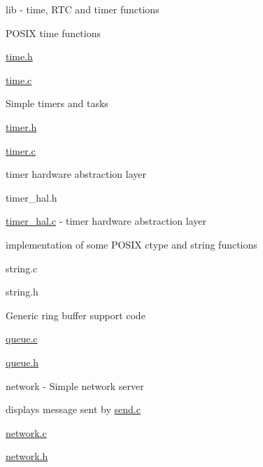 \begin{DoxyItemize}
\item lib -\/ time, R\+TC and timer functions
\begin{DoxyItemize}
\item P\+O\+S\+IX time functions
\begin{DoxyItemize}
\item \hyperlink{time_8h}{time.\+h}
\item \hyperlink{time_8c}{time.\+c}
\end{DoxyItemize}
\item Simple timers and tasks
\begin{DoxyItemize}
\item \hyperlink{timer_8h}{timer.\+h}
\item \hyperlink{timer_8c}{timer.\+c}
\end{DoxyItemize}
\item timer hardware abstraction layer
\begin{DoxyItemize}
\item timer\+\_\+hal.\+h
\item \hyperlink{timer__hal_8c}{timer\+\_\+hal.\+c} -\/ timer hardware abstraction layer
\end{DoxyItemize}
\item implementation of some P\+O\+S\+IX ctype and string functions
\begin{DoxyItemize}
\item string.\+c
\item string.\+h
\end{DoxyItemize}
\item Generic ring buffer support code
\begin{DoxyItemize}
\item \hyperlink{queue_8c}{queue.\+c}
\item \hyperlink{queue_8h}{queue.\+h}
\end{DoxyItemize}
\end{DoxyItemize}
\item network -\/ Simple network server
\begin{DoxyItemize}
\item displays message sent by \hyperlink{send_8c}{send.\+c}
\begin{DoxyItemize}
\item \hyperlink{network_8c}{network.\+c}
\item \hyperlink{network_8h}{network.\+h}
\end{DoxyItemize}
\end{DoxyItemize}

\end{DoxyItemize}
